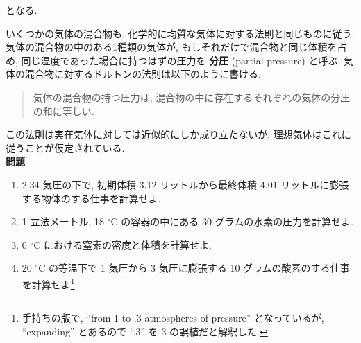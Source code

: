 となる. \par
いくつかの気体の混合物も, 化学的に均質な気体に対する法則と同じものに従う. 気体の混合物の中のある1種類の気体が, もしそれだけで混合物と同じ体積を占め, 同じ温度であった場合に持つはずの圧力を \textbf{分圧} (partial pressure) と呼ぶ. 気体の混合物に対するドルトンの法則は以下のように書ける. 

\begin{quote}
気体の混合物の持つ圧力は, 混合物の中に存在するそれぞれの気体の分圧の和に等しい. 
\end{quote}

この法則は実在気体に対しては近似的にしか成り立たないが, 理想気体はこれに従うことが仮定されている.
\\

\textbf{\centering 問題}
\begin{enumerate}
\item 2.34 気圧の下で, 初期体積 3.12 リットルから最終体積 4.01 リットルに膨張する物体のする仕事を計算せよ.
\item 1 立法メートル, 18 $^\circ$C の容器の中にある 30 グラムの水素の圧力を計算せよ.
\item 0 $^\circ$C における窒素の密度と体積を計算せよ.
\item 20 $^\circ$C の等温下で 1 気圧から 3 気圧に膨張する 10 グラムの酸素のする仕事を計算せよ\footnote{手持ちの版で, ``from 1 to .3 atmospheres of pressure'' となっているが, ``expanding'' とあるので ``.3'' を 3 の誤植だと解釈した.}. 
\end{enumerate}
